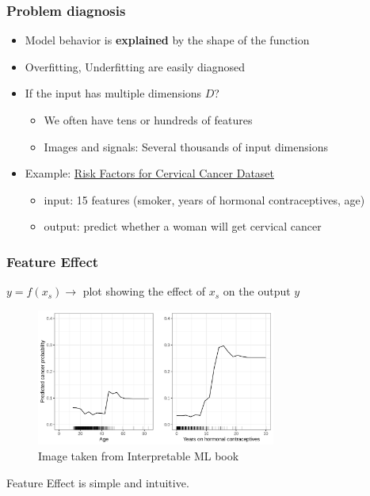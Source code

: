 \documentclass{beamer}
\newcommand{\obf}[1]{{\color{orange} \textbf{#1}}}
\begin{document}
\begin{frame}
  \frametitle{Problem diagnosis}

  \begin{itemize}
  \item Model behavior is \obf{explained} by the shape of the function
  \item Overfitting, Underfitting are easily diagnosed
  \item If the input has multiple dimensions $D$?
    \begin{itemize}
    \item We often have tens or hundreds of features
    \item Images and signals: Several thousands of input dimensions
    \end{itemize}
  \item Example: \href{https://link.springer.com/chapter/10.1007/978-3-319-58838-4_27}{Risk Factors for Cervical Cancer Dataset}
    \begin{itemize}
    \item input: 15 features (smoker, years of hormonal contraceptives, age)
    \item output: predict whether a woman will get cervical cancer
    \end{itemize}

  \end{itemize}


\end{frame}




\begin{frame}
  \frametitle{Feature Effect}
  \(y = f(x_s) \rightarrow\) plot showing the effect of \(x_s\) on the output \(y\)
  \vspace{2mm}
  \begin{figure}[ht]
    \centering
    \includegraphics[width=0.7\textwidth]{./figures/pdp-cervical-1.jpeg}
    \caption{Image taken from Interpretable ML book~\citep{molnar2022}}
  \end{figure}

  \noindent\makebox[\linewidth]{\rule{\paperwidth}{0.4pt}}
  Feature Effect is simple and intuitive.
\end{frame}
\end{document}
